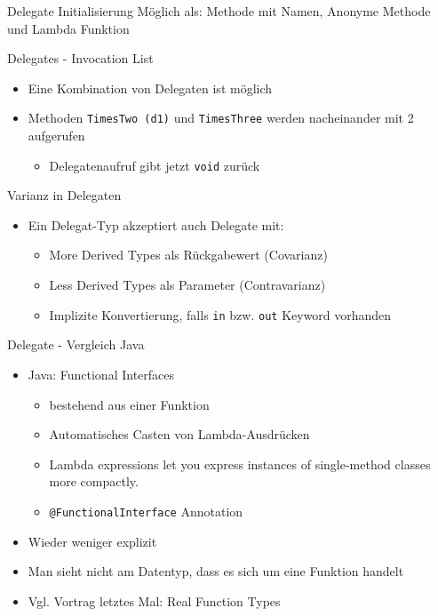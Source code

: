\documentclass[11pt]{beamer}
\begin{document}
\begin{frame}{Delegate}
	Initialisierung Möglich als: Methode mit Namen, Anonyme Methode und Lambda Funktion
\end{frame}

\begin{frame}{Delegates - Invocation List}
	\begin{itemize}
		\item  Eine Kombination von Delegaten ist möglich
		\item Methoden \texttt{TimesTwo (d1)} und \texttt{TimesThree} werden nacheinander mit 2 aufgerufen
		\begin{itemize}
			\item Delegatenaufruf gibt jetzt \texttt{void} zurück
		\end{itemize}
	\end{itemize}
\end{frame}

\begin{frame}{Varianz in Delegaten}
	\begin{itemize}
	 	\item Ein Delegat-Typ akzeptiert auch Delegate mit:
	 	\begin{itemize}
	 		\item \glqq More Derived Types\grqq{} als Rückgabewert (Covarianz)
	 		\item \glqq Less Derived Types\grqq{} als Parameter (Contravarianz)
	 		\item Implizite Konvertierung, falls \texttt{in} bzw. \texttt{out} Keyword vorhanden
	 	\end{itemize}
	\end{itemize}
\end{frame}

\begin{frame}{Delegate - Vergleich Java}
	\begin{itemize}
		\item Java: Functional Interfaces
		\begin{itemize}
			\item bestehend aus einer Funktion
			\item Automatisches Casten von Lambda-Ausdrücken
			\item \glqq Lambda expressions let you express instances of single-method classes more compactly.\grqq
			\item \texttt{@FunctionalInterface} Annotation		
		\end{itemize}
		\item Wieder weniger explizit
		\item Man sieht nicht am Datentyp, dass es sich um eine Funktion handelt
		\item Vgl. Vortrag letztes Mal: \glqq Real Function Types\grqq
	\end{itemize}
\end{frame}
\end{document}
